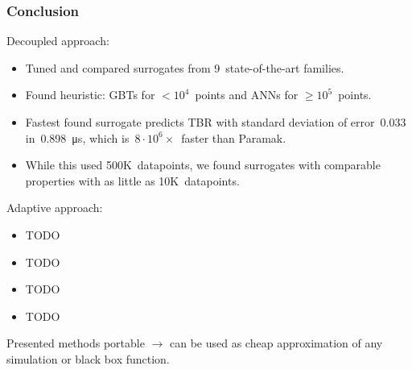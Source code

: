 \begin{frame}
	\frametitle{Conclusion}

	Decoupled approach:

	\begin{itemize}
		\item
			Tuned and compared surrogates from 9~state-of-the-art families.
		\item
			Found heuristic: GBTs for $<10^4$~points and
			ANNs for $\geq10^5$~points.
		\item
			Fastest found surrogate predicts TBR with standard deviation of
			error~$\num{0.033}$ in~\SI{0.898}{\micro\second}, which is~$8\cdot
			10^6\times$~faster than Paramak.
		\item
			While this used 500K~datapoints, we found surrogates with
			comparable properties with as little as 10K~datapoints.
	\end{itemize}

	\vspace{0.5em}

	Adaptive approach:
	\begin{itemize}
		\item 
			TODO %
		\item
			TODO %
		\item
			TODO %
		\item
			TODO %
	\end{itemize}

	\vspace{0.5em}

	Presented methods portable $\rightarrow$ can be used as cheap
	approximation of any simulation or black box function.
\end{frame}

